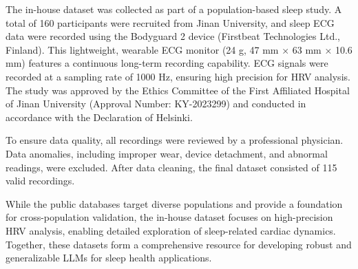 \documentclass[preprint,12pt]{elsarticle}
\begin{document}
The in-house dataset was collected as part of a population-based sleep study. A total of 160 participants were recruited from Jinan University, and sleep ECG data were recorded using the Bodyguard 2 device (Firstbeat Technologies Ltd., Finland). This lightweight, wearable ECG monitor (24 g, 47 mm × 63 mm × 10.6 mm) features a continuous long-term recording capability. ECG signals were recorded at a sampling rate of 1000 Hz, ensuring high precision for HRV analysis. The study was approved by the Ethics Committee of the First Affiliated Hospital of Jinan University (Approval Number: KY-2023299) and conducted in accordance with the Declaration of Helsinki.

To ensure data quality, all recordings were reviewed by a professional physician. Data anomalies, including improper wear, device detachment, and abnormal readings, were excluded. After data cleaning, the final dataset consisted of 115 valid recordings.

While the public databases target diverse populations and provide a foundation for cross-population validation, the in-house dataset focuses on high-precision HRV analysis, enabling detailed exploration of sleep-related cardiac dynamics. Together, these datasets form a comprehensive resource for developing robust and generalizable LLMs for sleep health applications.
\end{document}
